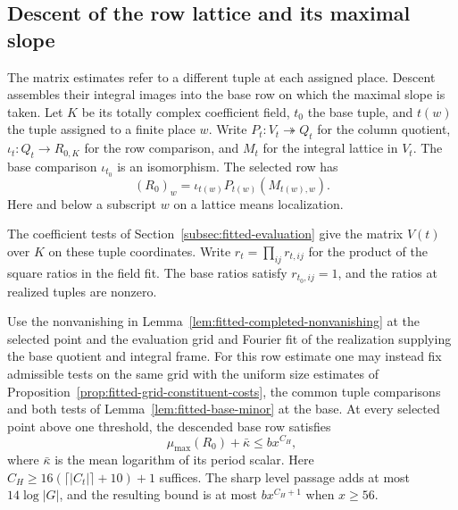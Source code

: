 \subsection{Descent of the row lattice and its maximal slope}
\label{subsec:fitted-row-height}

The matrix estimates refer to a different tuple at each assigned place. Descent assembles their integral images into the base row on which the maximal slope is taken. Let \(K\) be its
totally complex coefficient field, \(t_0\) the base tuple,
and \(t(w)\) the tuple assigned to a finite place \(w\).
Write \(P_t:V_t\twoheadrightarrow Q_t\) for the column quotient,
\(\iota_t:Q_t\to R_{0,K}\) for the row comparison, and \(M_t\) for
the integral lattice in \(V_t\). The base comparison \(\iota_{t_0}\)
is an isomorphism. The selected row has
\[
 (R_0)_w=\iota_{t(w)}P_{t(w)}(M_{t(w),w}).
\]
Here and below a subscript \(w\) on a lattice means localization.

The coefficient tests of Section~\ref{subsec:fitted-evaluation} give the matrix \(V(t)\) over \(K\) on these tuple coordinates.
Write \(r_t=\prod_{ij}r_{t,ij}\) for the
product of the square ratios in the field fit. The base ratios
satisfy \(r_{t_0,ij}=1\), and the ratios at realized tuples are
nonzero.

\begin{proposition}
\label{prop:descended-row-height}
Use the nonvanishing in Lemma~\ref{lem:fitted-completed-nonvanishing} at the selected point and the evaluation grid and Fourier fit of the realization supplying the base quotient and integral frame. For this row estimate one may instead fix admissible tests on the same grid with the uniform size estimates of Proposition~\ref{prop:fitted-grid-constituent-costs}, the common tuple comparisons and both tests of Lemma~\ref{lem:fitted-base-minor} at the base. At every selected point above one threshold, the descended base row satisfies
\[
 \mu_{\max}(R_0)+\bar\kappa\le b x^{C_H},
\]
where
\(\bar\kappa\) is the mean logarithm of its period scalar.
Here \(C_H\ge16(\lceil|C_t|\rceil+10)+1\) suffices. The sharp
level passage adds at most \(14\log|G|\), and the resulting
bound is at most \(b x^{C_H+1}\) when \(x\ge56\).
\end{proposition}

